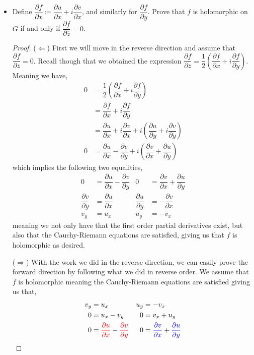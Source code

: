 \documentclass[11pt]{article}
\newenvironment{problem}[2][Problem\!]{\begin{trivlist}
\item[\hskip \labelsep {\bfseries #1}\hskip \labelsep {\bfseries #2}]}{\end{trivlist}}
\newenvironment{solution}{\begin{proof}[\textbf{\textit{Solution}}] }{\end{proof}}
\newcommand{\conj}[1]{\overline{#1}}
\newcommand{\pdiv}[2]{\dfrac{\partial #1}{\partial #2}}
\newcommand{\tcr}[1]{\textcolor{red}{#1}}
\newcommand{\tcb}[1]{\textcolor{blue}{#1}}
\newcommand{\lrp}[1]{\left(#1\right)}
\begin{document}
\begin{problem}{4.2}
\begin{itemize}[itemsep=3em]
\begin{solution}
\end{solution}

\item[(b)] Define $\dfrac{\partial f}{\partial x} \coloneqq \dfrac{\partial u}{\partial x} + i\dfrac{\partial v}{\partial x}$, and similarly for $\dfrac{\partial f}{\partial y}$. Prove that $f$ is holomorphic on $G$ if and only if $\dfrac{\partial f}{\partial \overline{z}} = 0$.
\begin{proof}
  ($\Leftarrow$) First we will move in the reverse direction and assume that $\pdiv{f}{\conj{z}} = 0.$ Recall though that we obtained the expression $\pdiv{f}{\conj{z}} = \dfrac{1}{2}\lrp{\pdiv{f}{x} + i\pdiv{f}{y}}$. Meaning we have,
  \begin{align*}
    0 &= \dfrac{1}{2}\lrp{\pdiv{f}{x} + i\pdiv{f}{y}} \\
    &= \pdiv{f}{x} + i \pdiv{f}{y} \\
    &= \pdiv{u}{x} + i\pdiv{v}{x} + i\lrp{\pdiv{u}{y} + i\pdiv{v}{y}} \\
    0&= \pdiv{u}{x} -\pdiv{v}{y} + i\lrp{\pdiv{v}{x} + \pdiv{u}{y}}
  \end{align*}
  which implies the following two equalities,
  \begin{align*}
    0 &= \pdiv{u}{x} - \pdiv{v}{y} &  0 &= \pdiv{v}{x} + \pdiv{u}{y} \\
    \pdiv{v}{y} &= \pdiv{u}{x} & \pdiv{u}{y} &= -\pdiv{v}{x} \\
    v_y &= u_x & u_y &= -v_x
  \end{align*}
  meaning we not only have that the first order partial derivatives exist, but also that the Cauchy-Riemann equations are satisfied, giving us that $f$ is holomorphic as desired.

  ($\Rightarrow$) With the work we did in the reverse direction, we can easily prove the forward direction by following what we did in reverse order. We assume that $f$ is holomorphic meaning the Cauchy-Riemann equations are satisfied giving us that,
  \begin{align*}
    v_y &= u_x & u_y &= -v_x \\
    0 &= u_x - v_y & 0&= v_x + u_y \\
    0 &=\tcr{\pdiv{u}{x}} - \tcr{\pdiv{v}{y}} & 0 &= \tcb{\pdiv{v}{x}} + \tcb{\pdiv{u}{y}}
  \end{align*}


\end{proof}
\end{itemize}
\end{problem}
\end{document}
